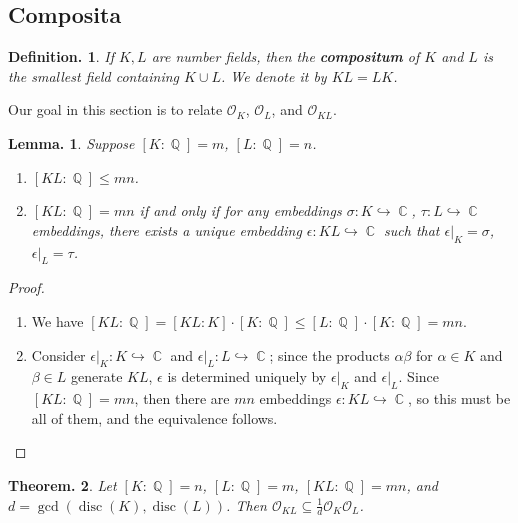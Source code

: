 \documentclass[11pt, a4paper]{memoir}
\DeclareMathOperator{\Q}{{\mathbb{Q}}}
\DeclareMathOperator{\C}{{\mathbb{C}}}
\newcommand{\hto}[0]{\ensuremath{\hookrightarrow}}
\theoremstyle{change}
\newtheorem{theorem}{Theorem.}[section]
\newtheorem{lemma}[theorem]{Lemma.}
\theoremstyle{plain}
\theoremstyle{nonumberplain}
\newtheorem{definition}{Definition.}
\newtheorem{remark}{Remark.}
\newtheorem{proof}{Proof}
\DeclareMathOperator{\disc}{disc}
\newcommand{\quot}[2]{\mathchoice{\left.\raisebox{0.07em}{$#1$}\middle/\raisebox{-0.07em}{$#2$}\right.}
                                 {\left.\raisebox{0.03em}{$#1$}\middle/\raisebox{-0.03em}{$#2$}\right.}
                                 {\left.\raisebox{0.00em}{$#1$}\middle/\raisebox{-0.00em}{$#2$}\right.}
                                 {\left.\raisebox{0em}{$#1$}\middle/\raisebox{0em}{$#2$}\right.}}
\newcommand{\mbf}[1]{{\boldmath\bfseries #1}}
\numberwithin{equation}{section}
\begin{document}
\subsection{Composita}
\begin{definition}
    If $K,L$ are number fields, then the \mbf{compositum} of $K$ and $L$ is the smallest field containing $K\cup L$.
    We denote it by $KL=LK$.
\end{definition}
Our goal in this section is to relate $\mathcal{O}_K$, $\mathcal{O}_L$, and $\mathcal{O}_{KL}$.
\begin{lemma}\label{l:ext-comp}
    Suppose $[K:\Q]=m$, $[L:\Q]=n$.
    \begin{enumerate}[nl,r]
        \item $[KL:\Q]\leq mn$.
        \item $[KL:\Q]=mn$ if and only if for any embeddings $\sigma:K\hto\C$, $\tau:L\hto\C$ embeddings, there exists a unique embedding $\epsilon:KL\hto\C$ such that $\epsilon|_K=\sigma$, $\epsilon|_L=\tau$.
    \end{enumerate}
\end{lemma}
\begin{proof}
    \begin{enumerate}[nl,r]
        \item We have $[KL:\Q]=[KL:K]\cdot[K:\Q]\leq[L:\Q]\cdot[K:\Q]=mn$.
        \item Consider $\epsilon|_K:K\hto \C$ and $\epsilon|_L:L\hto\C$; since the products $\alpha\beta$ for $\alpha\in K$ and $\beta\in L$ generate $KL$, $\epsilon$ is determined uniquely by $\epsilon|_K$ and $\epsilon|_L$.
            Since $[KL:\Q]=mn$, then there are $mn$ embeddings $\epsilon:KL\hto\C$, so this must be all of them, and the equivalence follows.
    \end{enumerate}
\end{proof}
\begin{theorem}\label{t:comp}
    Let $[K:\Q]=n$, $[L:\Q]=m$, $[KL:\Q]=mn$, and $d=\gcd(\disc(K),\disc(L))$.
    Then $\mathcal{O}_{KL}\subseteq\frac{1}{d}\mathcal{O}_K\mathcal{O}_L$.
\end{theorem}
\end{document}
